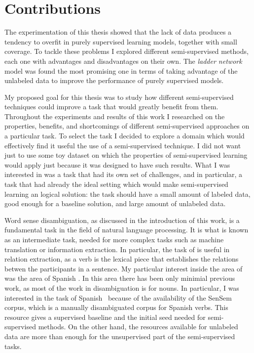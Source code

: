 \section{Contributions}

The experimentation of this thesis showed that the lack of data produces a
tendency to overfit in purely supervised learning models, together with small
coverage. To tackle these problems I explored different semi-supervised
methods, each one with advantages and disadvantages on their own. The {\em
ladder network} model was found the most promising one in terms of taking
advantage of the unlabeled data to improve the performance of purely supervised
models.

My proposed goal for this thesis was to study how different semi-supervised
techniques could improve a task that would greatly benefit from them.
Throughout the experiments and results of this work I researched on the
properties, benefits, and shortcomings of different semi-supervised approaches
on a particular task. To select the task I decided to explore a domain which
would effectively find it useful the use of a semi-supervised technique. I did
not want just to use some toy dataset on which the properties of
semi-supervised learning would apply just because it was designed to have such
results. What I was interested in was a task that had its own set of
challenges, and in particular, a task that had already the ideal setting which
would make semi-supervised learning an logical solution: the task should have a
small amount of labeled data, good enough for a baseline solution, and large
amount of unlabeled data.

Word sense disambiguation, as discussed in the introduction of this work, is a
fundamental task in the field of natural language processing. It is what is
known as an intermediate task, needed for more complex tasks such as machine
translation or information extraction. In particular, the task of \vsd is
useful in relation extraction, as a verb is the lexical piece that establishes
the relations betwen the participants in a sentence. My particular interest
inside the area of \vsd was the area of Spanish \vsd. In this area there has
been only minimial previous work, as most of the work in disambiguation is for
nouns. In particular, I was interested in the task of Spanish \vsd~because of
the availability of the SenSem corpus, which is a manually disambiguated corpus
for Spanish verbs. This resource gives a supervised baseline and the initial
seed needed for semi-supervised methods. On the other hand, the resources
available for unlabeled data are more than enough for the unsupervised part of
the semi-supervised tasks.

